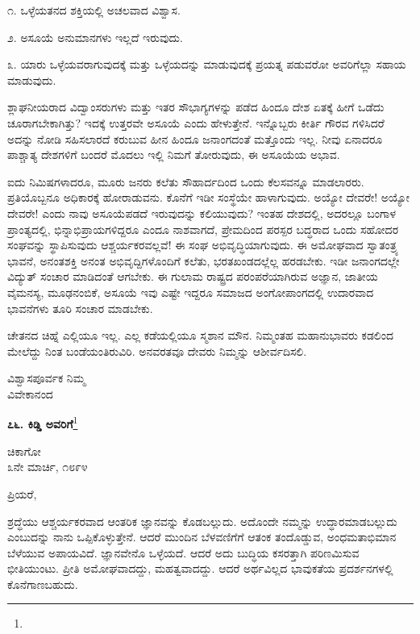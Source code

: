 ೧. ಒಳ್ಳೆಯತನದ ಶಕ್ತಿಯಲ್ಲಿ ಅಚಲವಾದ ವಿಶ್ವಾಸ.

೨. ಅಸೂಯೆ ಅನುಮಾನಗಳು ಇಲ್ಲದೆ ಇರುವುದು.

೩. ಯಾರು ಒಳ್ಳೆಯವರಾಗುವುದಕ್ಕೆ ಮತ್ತು ಒಳ್ಳೆಯದನ್ನು ಮಾಡುವುದಕ್ಕೆ ಪ್ರಯತ್ನ ಪಡುವರೋ ಅವರಿಗೆಲ್ಲಾ ಸಹಾಯ ಮಾಡುವುದು.

ಶ್ಲಾಘನೀಯರಾದ ವಿದ್ವಾಂಸರುಗಳು ಮತ್ತು ಇತರ ಸೌಭಾಗ್ಯಗಳನ್ನು ಪಡೆದ ಹಿಂದೂ ದೇಶ ಏತಕ್ಕೆ ಹೀಗೆ ಒಡೆದು ಚೂರಾಗಬೇಕಾಗಿತ್ತು? ಇದಕ್ಕೆ ಉತ್ತರವೇ ಅಸೂಯೆ ಎಂದು ಹೇಳುತ್ತೇನೆ. ಇನ್ನೊಬ್ಬರು ಕೀರ್ತಿ ಗೌರವ ಗಳಿಸಿದರೆ ಅದನ್ನು ನೋಡಿ ಸಹಿಸಲಾರದೆ ಕರುಬುವ ಹೀನ ಹಿಂದೂ ಜನಾಂಗದಂತೆ ಮತ್ತೊಂದು ಇಲ್ಲ. ನೀವು ಏನಾದರೂ ಪಾಶ್ಚಾತ್ಯ ದೇಶಗಳಿಗೆ ಬಂದರೆ ಮೊದಲು ಇಲ್ಲಿ ನಿಮಗೆ ತೋರುವುದು, ಈ ಅಸೂಯೆಯ ಅಭಾವ.

ಐದು ನಿಮಿಷಗಳಾದರೂ, ಮೂರು ಜನರು ಕಲೆತು ಸೌಹಾರ್ದದಿಂದ ಒಂದು ಕೆಲಸವನ್ನೂ ಮಾಡಲಾರರು. ಪ್ರತಿಯೊಬ್ಬನೂ ಅಧಿಕಾರಕ್ಕೆ ಹೋರಾಡುವನು. ಕೊನೆಗೆ ಇಡೀ ಸಂಸ್ಥೆಯೇ ಹಾಳಾಗುವುದು. ಅಯ್ಯೋ ದೇವರೇ! ಅಯ್ಯೋ ದೇವರೇ! ಎಂದು ನಾವು ಅಸೂಯೆಪಡದೆ ಇರುವುದನ್ನು ಕಲಿಯುವುದು? ಇಂತಹ ದೇಶದಲ್ಲಿ, ಅದರಲ್ಲೂ ಬಂಗಾಳ ಪ್ರಾಂತ್ಯದಲ್ಲಿ, ಭಿನ್ನಾಭಿಪ್ರಾಯಗಳಿದ್ದರೂ ಎಂದೂ ನಾಶವಾಗದೆ, ಪ್ರೇಮದಿಂದ ಪರಸ್ಪರ ಬದ್ಧರಾದ ಒಂದು ಸಹೋದರ ಸಂಘವನ್ನು ಸ್ಥಾಪಿಸುವುದು ಆಶ್ಚರ್ಯಕರವಲ್ಲವೆ! ಈ ಸಂಘ ಅಭಿವೃದ್ಧಿಯಾಗುವುದು. ಈ ಅಮೋಘವಾದ ಸ್ವಾತಂತ್ರ್ಯ ಭಾವನೆ, ಅನಂತಶಕ್ತಿ ಅನಂತ ಅಭಿವೃದ್ದಿಗಳೊಂದಿಗೆ ಕಲೆತು, ಭರತಖಂಡದಲ್ಲೆಲ್ಲ ಹರಡಬೇಕು. ಇಡೀ ಜನಾಂಗದಲ್ಲೇ ವಿದ್ಯುತ್‌ ಸಂಚಾರ ಮಾಡಿದಂತೆ ಆಗಬೇಕು. ಈ ಗುಲಾಮ ರಾಷ್ಟ್ರದ ಪರಂಪರೆಯಾಗಿರುವ ಅಜ್ಞಾನ, ಜಾತೀಯ ವೈಮನಸ್ಯ, ಮೂಢನಂಬಿಕೆ, ಅಸೂಯೆ ಇವು ಎಷ್ಟೇ ಇದ್ದರೂ ಸಮಾಜದ ಅಂಗೋಪಾಂಗದಲ್ಲಿ ಉದಾರವಾದ ಭಾವನೆಗಳು ತೂರಿ ಸಂಚಾರ ಮಾಡಬೇಕು.

ಚೇತನದ ಚಿಹ್ನೆ ಎಲ್ಲಿಯೂ ಇಲ್ಲ. ಎಲ್ಲ ಕಡೆಯಲ್ಲಿಯೂ ಸ್ಮಶಾನ ಮೌನ. ನಿಮ್ಮಂತಹ ಮಹಾನುಭಾವರು ಕಡಲಿಂದ ಮೇಲೆದ್ದು ನಿಂತ ಬಂಡೆಯಂತಿರುವಿರಿ. ಅನವರತವೂ ದೇವರು ನಿಮ್ಮನ್ನು ಆಶೀರ್ವದಿಸಲಿ.

{\flushright
ವಿಶ್ವಾಸಪೂರ್ವಕ ನಿಮ್ಮ\\ವಿವೇಕಾನಂದ\par}
\newpage

\begin{center}
\textbf{೭೬. ಕಿಡ್ಡಿ ಅವರಿಗೆ}\footnote{}
\end{center}
\vspace{-0.6cm}

\begin{flushright}
ಚಿಕಾಗೋ\\೩ನೇ ಮಾರ್ಚಿ, ೧೮೯೪
\end{flushright}
\vspace{-0.3cm}

\noindent
ಪ್ರಿಯರೆ,

ಶ್ರದ್ಧೆಯು ಆಶ್ಚರ್ಯಕರವಾದ ಆಂತರಿಕ ಜ್ಞಾನವನ್ನು ಕೊಡಬಲ್ಲುದು. ಅದೊಂದೇ ನಮ್ಮನ್ನು ಉದ್ಧಾರಮಾಡಬಲ್ಲುದು ಎಂಬುದನ್ನು ನಾನು ಒಪ್ಪಿಕೊಳ್ಳುತ್ತೇನೆ. ಆದರೆ ಮುಂದಿನ ಬೆಳವಣಿಗೆಗೆ ಆತಂಕ ತಂದೊಡ್ಡುವ, ಅಂಧಮತಾಭಿಮಾನ ಬೆಳೆಯುವ ಅಪಾಯವಿದೆ. ಜ್ಞಾನವೇನೊ ಒಳ್ಳೆಯದೆ. ಆದರೆ ಅದು ಬುದ್ಧಿಯ ಕಸರತ್ತಾಗಿ ಪರಿಣಮಿಸುವ ಭೀತಿಯುಂಟು. ಪ್ರೀತಿ ಅಮೋಘವಾದದ್ದು, ಮಹತ್ವವಾದದ್ದು. ಆದರೆ ಅರ್ಥವಿಲ್ಲದ ಭಾವುಕತೆಯ ಪ್ರದರ್ಶನಗಳಲ್ಲಿ ಕೊನೆಗಾಣಬಹುದು.


